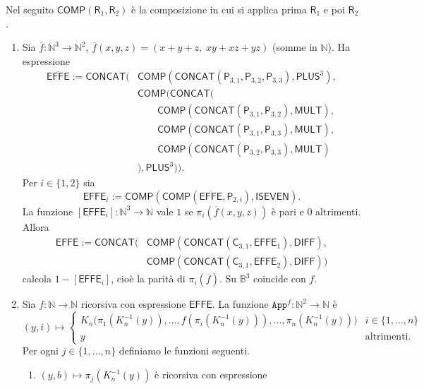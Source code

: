 \begin{sol}
Nel seguito $\mathsf{COMP}(\mathsf R_1,\mathsf R_2)$ è la composizione in cui si applica prima $\mathsf R_1$ e poi $\mathsf R_2$.
\ 
\begin{enumerate}
\item Sia $\overline f:\mathbb N^3\to\mathbb N^2$, $\overline f(x,y,z)=(x+y+z,\;xy+xz+yz)$ (somme in $\mathbb N$). Ha espressione
\[
\begin{aligned}
\overline{\mathsf{EFFE}}:=\mathsf{CONCAT}\Big(&\mathsf{COMP}(\mathsf{CONCAT}(\mathsf P_{3,1},\mathsf P_{3,2},\mathsf P_{3,3}),\mathsf{PLUS}^3),\\
&\mathsf{COMP}\big(\mathsf{CONCAT}(\\
&\qquad\mathsf{COMP}(\mathsf{CONCAT}(\mathsf P_{3,1},\mathsf P_{3,2}),\mathsf{MULT}),\\
&\qquad\mathsf{COMP}(\mathsf{CONCAT}(\mathsf P_{3,1},\mathsf P_{3,3}),\mathsf{MULT}),\\
&\qquad\mathsf{COMP}(\mathsf{CONCAT}(\mathsf P_{3,2},\mathsf P_{3,3}),\mathsf{MULT})\\
&\big),\mathsf{PLUS}^3\big)\Big).
\end{aligned}
\]
Per $i\in\{1,2\}$ sia
\[
\mathsf{EFFE}_i:=\mathsf{COMP}(\mathsf{COMP}(\overline{\mathsf{EFFE}},\mathsf P_{2,i}),\mathsf{ISEVEN}).
\]
La funzione $[\mathsf{EFFE}_i]:\mathbb N^3\to\mathbb N$ vale $1$ se $\pi_i(\overline f(x,y,z))$ è pari e $0$ altrimenti. Allora
\[
\begin{aligned}
\mathsf{EFFE}:=\mathsf{CONCAT}\Big(&\mathsf{COMP}(\mathsf{CONCAT}(\mathsf C_{3,1},\mathsf{EFFE}_1),\mathsf{DIFF}),\\
&\mathsf{COMP}(\mathsf{CONCAT}(\mathsf C_{3,1},\mathsf{EFFE}_2),\mathsf{DIFF})\Big)
\end{aligned}
\]
calcola $1-[\mathsf{EFFE}_i]$, cioè la parità di $\pi_i(\overline f)$. Su $\mathbb B^3$ coincide con $f$.
\item Sia $f:\mathbb N\to\mathbb N$ ricorsiva con espressione $\mathsf{EFFE}$. La funzione $\texttt{App}^f:\mathbb N^2\to\mathbb N$ è
\[
(y,i)\longmapsto
\begin{cases}
K_n\big(\pi_1(K_n^{-1}(y)),\dots,f(\pi_i(K_n^{-1}(y))),\dots,\pi_n(K_n^{-1}(y))\big) & i\in\{1,\dots,n\}\\
y & \text{altrimenti.}
\end{cases}
\]
Per ogni $j\in\{1,\dots,n\}$ definiamo le funzioni seguenti.
\ 
\begin{enumerate}
\item $(y,b)\mapsto\pi_j(K_n^{-1}(y))$ è ricorsiva con espressione

\end{enumerate}
\end{enumerate}
\end{sol}
